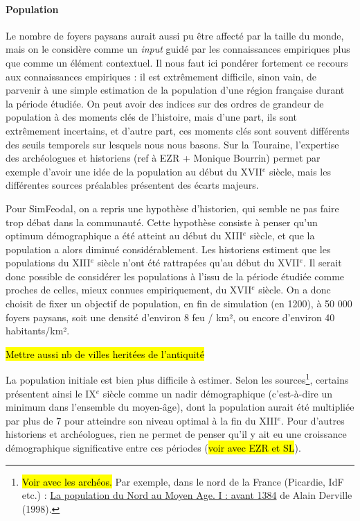 \paragraph{Population}
Le nombre de foyers paysans aurait aussi pu être affecté par la taille du monde, mais on le considère comme un \textit{input} guidé par les connaissances empiriques plus que comme un élément contextuel.
Il nous faut ici pondérer fortement ce recours aux connaissances empiriques : il est extrêmement difficile, sinon vain, de parvenir à une simple estimation de la population d'une région française durant la période étudiée.
On peut avoir des indices sur des ordres de grandeur de population à des moments clés de l'histoire, mais d'une part, ils sont extrêmement incertains, et d'autre part, ces moments clés sont souvent différents des seuils temporels sur lesquels nous nous basons.
Sur la Touraine, l'expertise des archéologues et historiens (ref à EZR + Monique Bourrin) permet par exemple d'avoir une idée de la population au début du XVII$^e$ siècle, mais les différentes sources préalables présentent des écarts majeurs.

Pour SimFeodal, on a repris une hypothèse d'historien, qui semble ne pas faire trop débat dans la communauté.
Cette hypothèse consiste à penser qu'un optimum démographique a été atteint au début du XIII$^e$ siècle, et que la population a alors diminué considérablement.
Les historiens estiment que les populations du XIII$^e$ siècle n'ont été rattrapées qu'au début du XVII$^e$.
Il serait donc possible de considérer les populations à l'issu de la période étudiée comme proches de celles, mieux connues empiriquement, du XVII$^e$ siècle.
On a donc choisit de fixer un objectif de population, en fin de simulation (en 1200), à 50 000 foyers paysans, soit une densité d'environ 8 feu / km², ou encore d'environ 40 habitants/km².

\hl{Mettre aussi nb de villes heritées de l'antiquité}

La population initiale est bien plus difficile à estimer.
Selon les sources\footnote{
	\hl{Voir avec les archéos.}
	Par exemple, dans le nord de la France (Picardie, IdF etc.) :  \og \href{https://www.persee.fr/doc/rnord_0035-2624_1998_num_80_326_2872}{La population du Nord au Moyen Age. I : avant 1384}\fg{} de Alain Derville (1998).
}, certains présentent ainsi le IX$^e$ siècle comme un \og nadir\fg{} démographique (c'est-à-dire un minimum dans l'ensemble du moyen-âge), dont la population aurait été multipliée par plus de 7 pour atteindre son niveau optimal à la fin du XIII$^e$.
Pour d'autres historiens et archéologues, rien ne permet de penser qu'il y ait eu une croissance démographique significative entre ces périodes (\hl{voir avec EZR et SL}).

